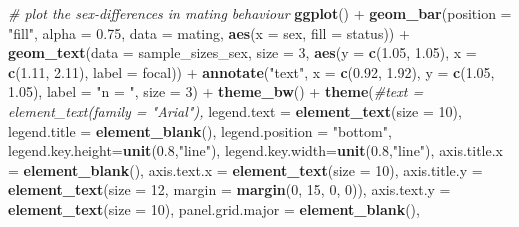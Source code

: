 \documentclass[]{article}
\newenvironment{Shaded}{\begin{snugshade}}{\end{snugshade}}
\newcommand{\KeywordTok}[1]{\textcolor[rgb]{0.13,0.29,0.53}{\textbf{{#1}}}}
\newcommand{\DataTypeTok}[1]{\textcolor[rgb]{0.13,0.29,0.53}{{#1}}}
\newcommand{\DecValTok}[1]{\textcolor[rgb]{0.00,0.00,0.81}{{#1}}}
\newcommand{\FloatTok}[1]{\textcolor[rgb]{0.00,0.00,0.81}{{#1}}}
\newcommand{\StringTok}[1]{\textcolor[rgb]{0.31,0.60,0.02}{{#1}}}
\newcommand{\CommentTok}[1]{\textcolor[rgb]{0.56,0.35,0.01}{\textit{{#1}}}}
\newcommand{\NormalTok}[1]{{#1}}
\begin{document}
\begin{Shaded}
\begin{Highlighting}[]
\CommentTok{# plot the sex-differences in mating behaviour}
\KeywordTok{ggplot}\NormalTok{() +}
\StringTok{  }\KeywordTok{geom_bar}\NormalTok{(}\DataTypeTok{position =} \StringTok{"fill"}\NormalTok{, }\DataTypeTok{alpha =} \FloatTok{0.75}\NormalTok{, }\DataTypeTok{data =} \NormalTok{mating, }\KeywordTok{aes}\NormalTok{(}\DataTypeTok{x =} \NormalTok{sex, }\DataTypeTok{fill =} \NormalTok{status)) +}
\StringTok{  }\KeywordTok{geom_text}\NormalTok{(}\DataTypeTok{data =} \NormalTok{sample_sizes_sex, }\DataTypeTok{size =} \DecValTok{3}\NormalTok{, }
            \KeywordTok{aes}\NormalTok{(}\DataTypeTok{y =} \KeywordTok{c}\NormalTok{(}\FloatTok{1.05}\NormalTok{, }\FloatTok{1.05}\NormalTok{), }\DataTypeTok{x =} \KeywordTok{c}\NormalTok{(}\FloatTok{1.11}\NormalTok{, }\FloatTok{2.11}\NormalTok{), }\DataTypeTok{label =} \NormalTok{focal)) +}
\StringTok{  }\KeywordTok{annotate}\NormalTok{(}\StringTok{"text"}\NormalTok{, }\DataTypeTok{x =} \KeywordTok{c}\NormalTok{(}\FloatTok{0.92}\NormalTok{, }\FloatTok{1.92}\NormalTok{), }\DataTypeTok{y =} \KeywordTok{c}\NormalTok{(}\FloatTok{1.05}\NormalTok{, }\FloatTok{1.05}\NormalTok{), }\DataTypeTok{label =} \StringTok{"n = "}\NormalTok{, }\DataTypeTok{size =} \DecValTok{3}\NormalTok{) +}
\StringTok{  }\KeywordTok{theme_bw}\NormalTok{() +}
\StringTok{  }\KeywordTok{theme}\NormalTok{(}\CommentTok{#text = element_text(family = "Arial"),}
        \DataTypeTok{legend.text =} \KeywordTok{element_text}\NormalTok{(}\DataTypeTok{size =} \DecValTok{10}\NormalTok{),}
        \DataTypeTok{legend.title =} \KeywordTok{element_blank}\NormalTok{(),}
        \DataTypeTok{legend.position =} \StringTok{"bottom"}\NormalTok{,}
        \DataTypeTok{legend.key.height=}\KeywordTok{unit}\NormalTok{(}\FloatTok{0.8}\NormalTok{,}\StringTok{"line"}\NormalTok{),}
        \DataTypeTok{legend.key.width=}\KeywordTok{unit}\NormalTok{(}\FloatTok{0.8}\NormalTok{,}\StringTok{"line"}\NormalTok{),}
        \DataTypeTok{axis.title.x =} \KeywordTok{element_blank}\NormalTok{(),}
        \DataTypeTok{axis.text.x  =} \KeywordTok{element_text}\NormalTok{(}\DataTypeTok{size =} \DecValTok{10}\NormalTok{), }
        \DataTypeTok{axis.title.y =} \KeywordTok{element_text}\NormalTok{(}\DataTypeTok{size =} \DecValTok{12}\NormalTok{, }\DataTypeTok{margin =} \KeywordTok{margin}\NormalTok{(}\DecValTok{0}\NormalTok{, }\DecValTok{15}\NormalTok{, }\DecValTok{0}\NormalTok{, }\DecValTok{0}\NormalTok{)),}
        \DataTypeTok{axis.text.y =} \KeywordTok{element_text}\NormalTok{(}\DataTypeTok{size =} \DecValTok{10}\NormalTok{), }
        \DataTypeTok{panel.grid.major =} \KeywordTok{element_blank}\NormalTok{(),}

\end{Highlighting}
\end{Shaded}
\end{document}
